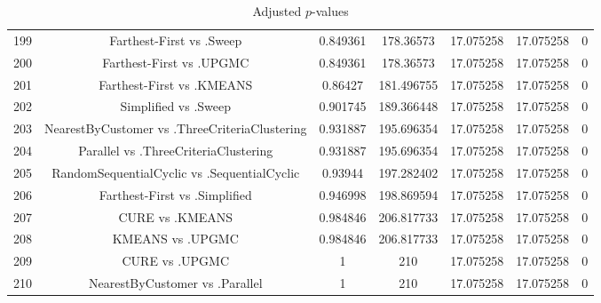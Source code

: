 \documentclass[a4paper,10pt]{article}
\begin{document}
\begin{landscape}
\begin{table}[!htp]
\begin{tabular}{ccccccc}
199&Farthest-First vs .Sweep&0.849361&178.36573&17.075258&17.075258&0\\
200&Farthest-First vs .UPGMC&0.849361&178.36573&17.075258&17.075258&0\\
201&Farthest-First vs .KMEANS&0.86427&181.496755&17.075258&17.075258&0\\
202&Simplified vs .Sweep&0.901745&189.366448&17.075258&17.075258&0\\
203&NearestByCustomer vs .ThreeCriteriaClustering&0.931887&195.696354&17.075258&17.075258&0\\
204&Parallel vs .ThreeCriteriaClustering&0.931887&195.696354&17.075258&17.075258&0\\
205&RandomSequentialCyclic vs .SequentialCyclic&0.93944&197.282402&17.075258&17.075258&0\\
206&Farthest-First vs .Simplified&0.946998&198.869594&17.075258&17.075258&0\\
207&CURE vs .KMEANS&0.984846&206.817733&17.075258&17.075258&0\\
208&KMEANS vs .UPGMC&0.984846&206.817733&17.075258&17.075258&0\\
209&CURE vs .UPGMC&1&210&17.075258&17.075258&0\\
210&NearestByCustomer vs .Parallel&1&210&17.075258&17.075258&0\\
\hline
\end{tabular}
\caption{Adjusted $p$-values}
\end{table}

\end{landscape}
\end{document}
